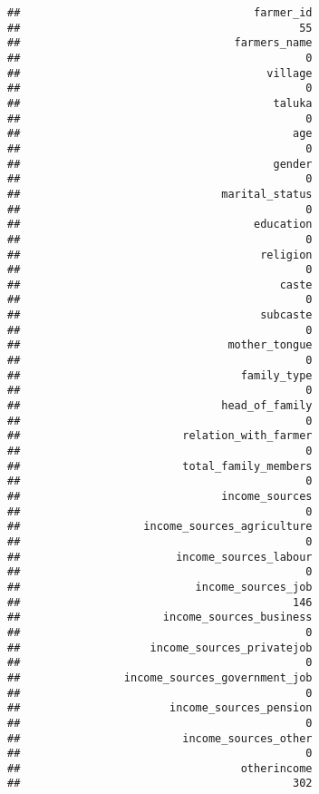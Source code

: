 \documentclass[
]{article}
\begin{document}
\begin{verbatim}
##                                    farmer_id 
##                                           55 
##                                 farmers_name 
##                                            0 
##                                      village 
##                                            0 
##                                       taluka 
##                                            0 
##                                          age 
##                                            0 
##                                       gender 
##                                            0 
##                               marital_status 
##                                            0 
##                                    education 
##                                            0 
##                                     religion 
##                                            0 
##                                        caste 
##                                            0 
##                                     subcaste 
##                                            0 
##                                mother_tongue 
##                                            0 
##                                  family_type 
##                                            0 
##                               head_of_family 
##                                            0 
##                         relation_with_farmer 
##                                            0 
##                         total_family_members 
##                                            0 
##                               income_sources 
##                                            0 
##                   income_sources_agriculture 
##                                            0 
##                        income_sources_labour 
##                                            0 
##                           income_sources_job 
##                                          146 
##                      income_sources_business 
##                                            0 
##                    income_sources_privatejob 
##                                            0 
##                income_sources_government_job 
##                                            0 
##                       income_sources_pension 
##                                            0 
##                         income_sources_other 
##                                            0 
##                                  otherincome 
##                                          302 

\end{verbatim}
\end{document}
